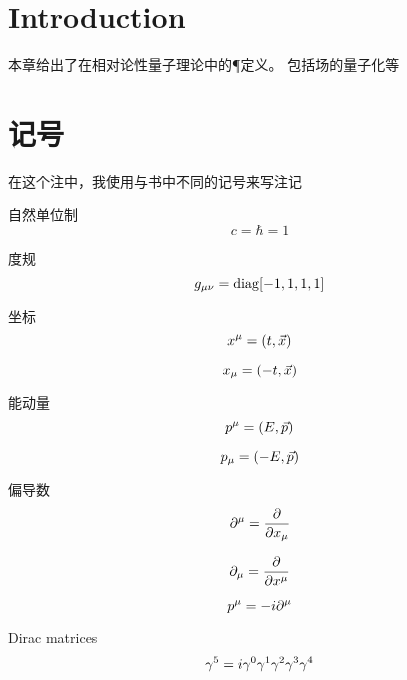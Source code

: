 \section{Introduction}
本章给出了在相对论性量子理论中的\C \P \T 定义。
包括场的量子化等

\section{记号}
在这个注中，我使用与书中不同的记号来写注记

自然单位制
\begin{equation}
    c = \hbar = 1
\end{equation}

度规
\begin{equation}
    g_{\mu\nu} = \mathrm{diag}[-1, 1, 1, 1]
\end{equation}

坐标
\begin{equation}
    x^{\mu} = (t, \vec x)
\end{equation}

\begin{equation}
    x_{\mu} = (-t, \vec x)
\end{equation}

能动量
\begin{equation}
    p^{\mu} = (E, \vec p)
\end{equation}

\begin{equation}
    p_{\mu} = (-E, \vec p)
\end{equation}

偏导数
\begin{equation}
    \partial^{\mu} = \frac \partial {\partial x_{\mu}}
\end{equation}

\begin{equation}
    \partial_{\mu} = \frac \partial {\partial x^{\mu}}
\end{equation}

\begin{equation}
    p^{\mu} = -i \partial^{\mu}
\end{equation}

Dirac matrices
\begin{equation}
    \gamma^{5} = i \gamma^{0} \gamma^{1} \gamma^{2} \gamma^{3} \gamma^{4}
\end{equation}

